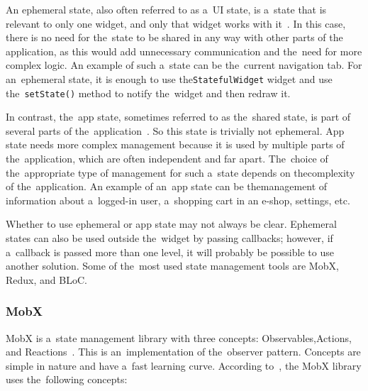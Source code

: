 An ephemeral state, also often referred to as a~UI state, is a~state that is relevant to only one widget, and only that widget works with it~\cite{a2022_differentiate}.
In this case, there is no need for the~state to be shared in any way with other parts of the application, as this would add unnecessary communication and the~need for more complex logic.
An example of such a~state can be the~current navigation tab.
For an~ephemeral state, it is enough to use the\linebreak{}\texttt{StatefulWidget} widget and use the~\texttt{setState()} method to notify the~widget and then redraw it.

In contrast, the~app state, sometimes referred to as the~shared state, is part of several parts of the~application~\cite{a2022_differentiate}.
So this state is trivially not ephemeral.
App state needs more complex management because it is used by multiple parts of the~application, which are often independent and far apart.
The~choice of the~appropriate type of management for such a~state depends on the\linebreak{}complexity of the~application.
An example of an~app state can be the\linebreak{}management of information about a~logged-in user, a~shopping cart in an \mbox{e-shop}, settings, etc.

Whether to use ephemeral or app state may not always be clear.
\linebreak
Ephemeral states can also be used outside the~widget by passing callbacks; however, if a~callback is passed more than one level, it will probably be possible to use another solution.
Some of the~most used state management tools are MobX, Redux, and BLoC.

\subsubsection{MobX}

MobX is a~state management library with three concepts: Observables,\linebreak{}Actions, and Reactions~\cite{a2022_mobxdart}.
This is an~implementation of the~observer \mbox{pattern}.
Concepts are simple in nature and have a~fast learning curve.
According to~\cite{a2022_mobxdart}, the MobX library uses the~following concepts:

